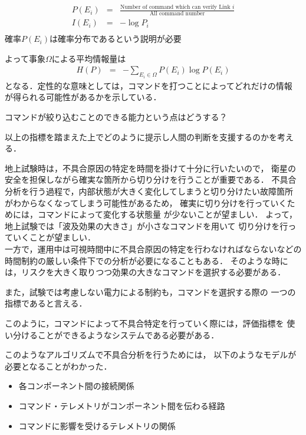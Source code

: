 \documentclass[11pt]{article}
\begin{document}
\begin{eqnarray}
   P(E_i) &=& \frac{\text{Number of command which can verify Link }i}{\text{All command number}} \label{eq:Pi}\\
   I(E_i) &=& -\log{P_{i}} \label{eq:I_i} \\
\end{eqnarray}
確率$P(E_i)$は確率分布であるという説明が必要

よって事象$\Omega$による平均情報量は
\begin{eqnarray}
   H(P) &=& -\sum_{E_i \in \Omega} P(E_i)\log{P(E_i)} 
\end{eqnarray}
となる．定性的な意味としては，コマンドを打つことによってどれだけの情報
が得られる可能性があるかを示している．

コマンドが絞り込むことのできる能力という点はどうする？

以上の指標を踏まえた上でどのように提示し人間の判断を支援するのかを考える．

地上試験時は，不具合原因の特定を時間を掛けて十分に行いたいので，
衛星の安全を担保しながら確実な箇所から切り分けを行うことが重要である．
不具合分析を行う過程で，内部状態が大きく変化してしまうと切り分けたい故障箇所
がわからなくなってしまう可能性があるため，
確実に切り分けを行っていくためには，コマンドによって変化する状態量
が少ないことが望ましい．
よって，地上試験では「波及効果の大きさ」が小さなコマンドを用いて
切り分けを行っていくことが望ましい．\\
一方で，運用中は可視時間中に不具合原因の特定を行わなければならないなどの
時間制約の厳しい条件下での分析が必要になることもある．
そのような時には，リスクを大きく取りつつ効果の大きなコマンドを選択する必要がある．

また，試験では考慮しない電力による制約も，コマンドを選択する際の
一つの指標であると言える．

このように，コマンドによって不具合特定を行っていく際には，評価指標を
使い分けることができるようなシステムである必要がある．

このようなアルゴリズムで不具合分析を行うためには，
以下のようなモデルが必要となることがわかった．
\begin{itemize}
   \item 各コンポーネント間の接続関係
   \item コマンド・テレメトリがコンポーネント間を伝わる経路
   \item コマンドに影響を受けるテレメトリの関係
\end{itemize}
\end{document}
